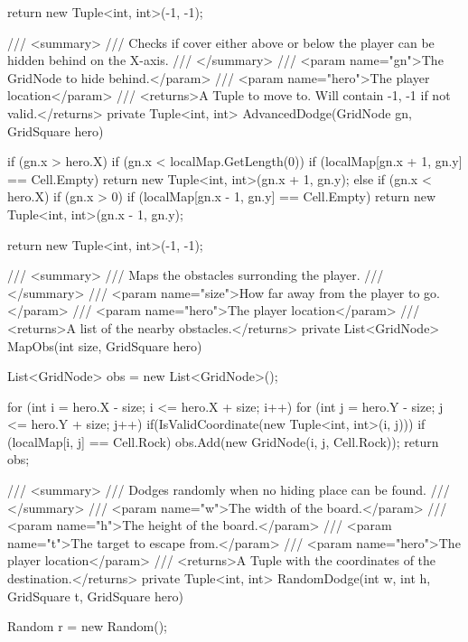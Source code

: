 \documentclass[11pt]{article}
\begin{document}
\begin{code}
{{{            return new Tuple<int, int>(-1, -1);
        }

        /// <summary>
        /// Checks if cover either above or below the player can be hidden behind on the X-axis.
        /// </summary>
        /// <param name="gn">The GridNode to hide behind.</param>
        /// <param name="hero">The player location</param>
        /// <returns>A Tuple to move to. Will contain -1, -1 if not valid.</returns>
        private Tuple<int, int> AdvancedDodge(GridNode gn, GridSquare hero)
        {
            if (gn.x > hero.X)
            {
                if (gn.x < localMap.GetLength(0))
                    if (localMap[gn.x + 1, gn.y] == Cell.Empty)
                        return new Tuple<int, int>(gn.x + 1, gn.y);
            }
            else if (gn.x < hero.X)
            {
                if (gn.x > 0)
                    if (localMap[gn.x - 1, gn.y] == Cell.Empty)
                        return new Tuple<int, int>(gn.x - 1, gn.y);
            }

            return new Tuple<int, int>(-1, -1);
        }

        /// <summary>
        /// Maps the obstacles surronding the player.
        /// </summary>
        /// <param name="size">How far away from the player to go.</param>
        /// <param name="hero">The player location</param>
        /// <returns>A list of the nearby obstacles.</returns>
        private List<GridNode> MapObs(int size, GridSquare hero)
        {
            List<GridNode> obs = new List<GridNode>();

            for (int i = hero.X - size; i <= hero.X + size; i++)
            {
                for (int j = hero.Y - size; j <= hero.Y + size; j++)
                {
                    if(IsValidCoordinate(new Tuple<int, int>(i, j)))
                        if (localMap[i, j] == Cell.Rock)
                            obs.Add(new GridNode(i, j, Cell.Rock));
                }
            }
            return obs;
        }

        /// <summary>
        /// Dodges randomly when no hiding place can be found.
        /// </summary>
        /// <param name="w">The width of the board.</param>
        /// <param name="h">The height of the board.</param>
        /// <param name="t">The target to escape from.</param>
        /// <param name="hero">The player location</param>
        /// <returns>A Tuple with the coordinates of the destination.</returns>
        private Tuple<int, int> RandomDodge(int w, int h, GridSquare t, GridSquare hero)
        {
            Random r = new Random();
            
}}}
\end{code}
\end{document}
